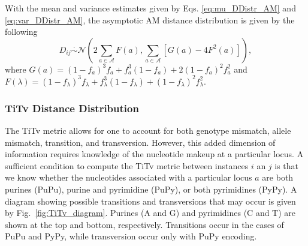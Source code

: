 \documentclass[10pt,letterpaper]{article}\usepackage[]{graphicx}\usepackage[]{color}
\begin{document}
With the mean and variance estimates given by Eqs. \ref{eq:mu_DDistr_AM} and \ref{eq:var_DDistr_AM}, the asymptotic AM distance distribution is given by the following
%
\begin{equation}\label{eq:DDistr_AM}
D_{ij} \overset{.}{\sim} \mathcal{N}\left(2\sum_{a \in \mathcal{A}} F(a), \sum_{a \in \mathcal{A}} \left[G(a)- 4F^2(a)\right]\right),
\end{equation}
where $G(a) = (1 - f_a)^3 f_a + f^3_a (1 - f_a) + 2 (1 - f_a)^2 f^2_a$ and $F(\lambda) = (1 - f_\lambda)^3 f_\lambda + f^3_\lambda (1 - f_\lambda) + (1 - f_\lambda)^2 f^2_\lambda$.

\subsubsection{TiTv Distance Distribution}

The TiTv metric allows for one to account for both genotype mismatch, allele mismatch, transition, and transversion. However, this added dimension of information requires knowledge of the nucleotide makeup at a particular locus. A sufficient condition to compute the TiTv metric between instances $i$ an $j$ is that we know whether the nucleotides associated with a particular locus $a$ are both purines (PuPu), purine and pyrimidine (PuPy), or both pyrimidines (PyPy). A diagram showing possible transitions and transversions that may occur is given by Fig.~\ref{fig:TiTv_diagram}. Purines (A and G) and pyrimidines (C and T) are shown at the top and bottom, respectively. Transitions occur in the cases of PuPu and PyPy, while transversion occur only with PuPy encoding.

\bigskip
\end{document}
